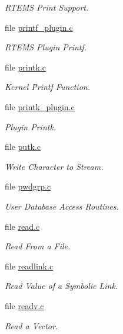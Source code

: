\begin{DoxyCompactItemize}
\begin{DoxyCompactList}\small\item\em R\+T\+E\+MS Print Support. \end{DoxyCompactList}\item 
file \mbox{\hyperlink{printf__plugin_8c}{printf\+\_\+plugin.\+c}}
\begin{DoxyCompactList}\small\item\em R\+T\+E\+MS Plugin Printf. \end{DoxyCompactList}\item 
file \mbox{\hyperlink{printk_8c}{printk.\+c}}
\begin{DoxyCompactList}\small\item\em Kernel Printf Function. \end{DoxyCompactList}\item 
file \mbox{\hyperlink{printk__plugin_8c}{printk\+\_\+plugin.\+c}}
\begin{DoxyCompactList}\small\item\em Plugin Printk. \end{DoxyCompactList}\item 
file \mbox{\hyperlink{putk_8c}{putk.\+c}}
\begin{DoxyCompactList}\small\item\em Write Character to Stream. \end{DoxyCompactList}\item 
file \mbox{\hyperlink{pwdgrp_8c}{pwdgrp.\+c}}
\begin{DoxyCompactList}\small\item\em User Database Access Routines. \end{DoxyCompactList}\item 
file \mbox{\hyperlink{libcsupport_2src_2read_8c}{read.\+c}}
\begin{DoxyCompactList}\small\item\em Read From a File. \end{DoxyCompactList}\item 
file \mbox{\hyperlink{readlink_8c}{readlink.\+c}}
\begin{DoxyCompactList}\small\item\em Read Value of a Symbolic Link. \end{DoxyCompactList}\item 
file \mbox{\hyperlink{readv_8c}{readv.\+c}}
\begin{DoxyCompactList}\small\item\em Read a Vector. \end{DoxyCompactList}\item 

\end{DoxyCompactItemize}
